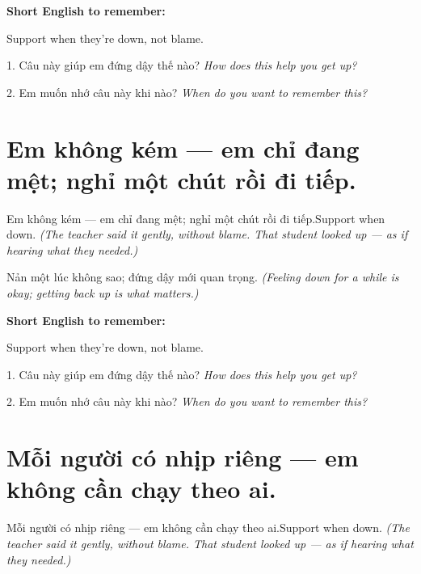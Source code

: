 \begin{ghinhoanh}
\textbf{Short English to remember:}

Support when they're down, not blame.

\end{ghinhoanh}

\begin{tuhocnhanh}
1. Câu này giúp em đứng dậy thế nào? \textit{How does this help you get up?}

2. Em muốn nhớ câu này khi nào? \textit{When do you want to remember this?}
\end{tuhocnhanh}
\ngancach


\section{Em không kém — em chỉ đang mệt; nghỉ một chút rồi đi tiếp.}
\begin{truyen}{Em không kém — em chỉ đang mệt; nghỉ một chút rồi đi tiếp.}{Support when down.}
\textit{(The teacher said it gently, without blame. That student looked up — as if hearing what they needed.)}
\end{truyen}

\begin{baihoc}
Nản một lúc không sao; đứng dậy mới quan trọng.
\textit{(Feeling down for a while is okay; getting back up is what matters.)}
\end{baihoc}

\begin{ghinhoanh}
\textbf{Short English to remember:}

Support when they're down, not blame.

\end{ghinhoanh}

\begin{tuhocnhanh}
1. Câu này giúp em đứng dậy thế nào? \textit{How does this help you get up?}

2. Em muốn nhớ câu này khi nào? \textit{When do you want to remember this?}
\end{tuhocnhanh}
\ngancach


\section{Mỗi người có nhịp riêng — em không cần chạy theo ai.}
\begin{truyen}{Mỗi người có nhịp riêng — em không cần chạy theo ai.}{Support when down.}
\textit{(The teacher said it gently, without blame. That student looked up — as if hearing what they needed.)}
\end{truyen}

